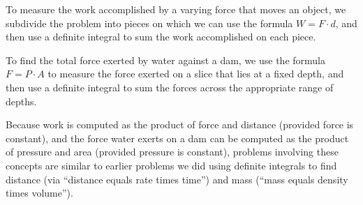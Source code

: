 \begin{summary}
  \item To measure the work accomplished by a varying force that moves an object, we subdivide the problem into pieces on which we can use the formula $W = F \cdot d$, and then use a definite integral to sum the work accomplished on each piece.
  \item To find the total force exerted by water against a dam, we use the formula $F = P \cdot A$ to measure the force exerted on a slice that lies at a fixed depth, and then use a definite integral to sum the forces across the appropriate range of depths.
  \item Because work is computed as the product of force and distance (provided force is constant), and the force water exerts on a dam can be computed as the product of pressure and area (provided pressure is constant), problems involving these concepts are similar to earlier problems we did using definite integrals to find distance (via ``distance equals rate times time'')  and mass (``mass equals density times volume'').
\end{summary}

\nin \hrulefill

 

\clearpage
